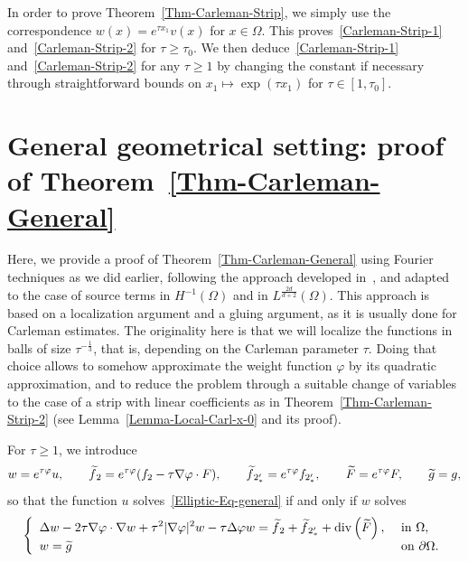 \documentclass[AHL,Unicode,longabstracts]{cedram}
\newcommand*\ds{\displaystyle}
\renewcommand{\geq}{\geqslant}
\renewcommand{\tilde}{\widetilde}
\renewcommand{\div}{\operatorname{div}}
\let\oldtilde\tilde
\renewcommand*{\tilde}[1]{\mathchoice{\widetilde{#1}}{\widetilde{#1}}{\oldtilde{#1}}{\oldtilde{#1}}}
\begin{document}
In order to prove Theorem~\ref{Thm-Carleman-Strip}, we simply use the correspondence $w(x) = e^{\tau x_1} v(x)$ for $x \in \Omega$. This proves~\eqref{Carleman-Strip-1} and~\eqref{Carleman-Strip-2} for $\tau \geq \tau_0$. We then deduce~\eqref{Carleman-Strip-1} and~\eqref{Carleman-Strip-2} for any $\tau \geq 1$ by changing the constant if necessary through straightforward bounds on $x_1 \mapsto \exp(\tau x_1) $ for $\tau \in [1, \tau_0]$.



\section{General geometrical setting: proof of Theorem~\ref{Thm-Carleman-General}}\label{Sec-Proof-Carl-General}

Here, we provide a proof of Theorem~\ref{Thm-Carleman-General} using Fourier techniques as we did earlier, following the approach developed in~\cite{darde2023short}, and adapted to the case of source terms in $H^{-1}(\Omega)$ and in $L^{\frac{2d}{d+2}}(\Omega)$. This approach is based on a localization argument and a gluing argument, as it is usually done for Carleman estimates. The originality here is that we will localize the functions in balls of size $\tau^{-\frac{1}{3}}$, that is, depending on the Carleman parameter $\tau$. Doing that choice allows to somehow approximate the weight function $\varphi$ by its quadratic approximation, and to reduce the problem through a suitable change of variables to the case of a strip with linear coefficients as in Theorem~\ref{Thm-Carleman-Strip-2} (see Lemma~\ref{Lemma-Local-Carl-x-0} and its proof).

For $\tau \geq 1$, we introduce
\begin{equation*}
w = e^{ \tau \varphi}u,
\qquad
\tilde f_2 = e^{\tau \varphi} (f_2 - \tau \nabla \varphi \cdot F),
\qquad
\tilde f_{2_*'} = e^{\tau \varphi} f_{2_*'},
\qquad
\tilde F = e^{\tau \varphi} F,
\qquad
\tilde g = g,
\end{equation*}
so that the function $u$ solves~\eqref{Elliptic-Eq-general} if and only if $w$ solves
\begin{equation}\label{Eq-Elliptic-w}
\left\{
\begin{array}{ll}
\ds \Delta w - 2\tau \nabla \varphi \cdot \nabla w + \tau^2 |\nabla \varphi|^2 w - \tau \Delta \varphi w = \tilde f_2 + \tilde f_{2_*'} + \div\left(\tilde F\right), &\text{ in } \Omega,
\\
\ds w = \tilde g & \text{ on } \partial \Omega.
\end{array}
\right.
\end{equation}
\end{document}
